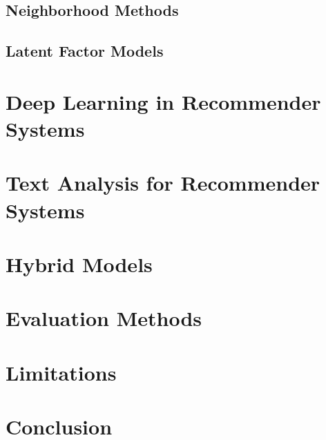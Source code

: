 \subsection{Neighborhood Methods}
\label{chp2-sec3.1}

\subsection{Latent Factor Models}
\label{chp2-sec3.2}



\section{Deep Learning in Recommender Systems}
\label{chp2-sec4}



\section{Text Analysis for Recommender Systems}
\label{chp2-sec5}




\section{Hybrid Models}
\label{chp2-sec6}



\section{Evaluation Methods}
\label{chp2-sec7}



\section{Limitations}
\label{chp2-sec8}



\section{Conclusion}
\label{chp2-sec9}

